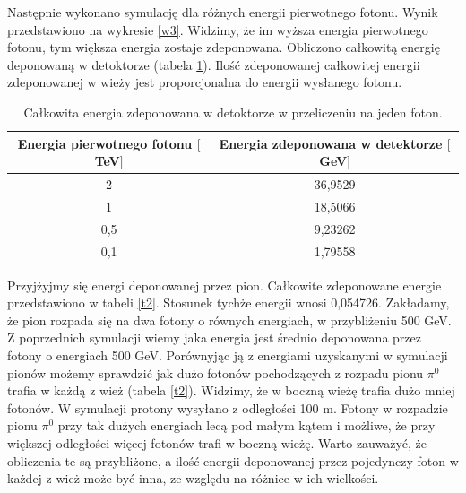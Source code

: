 \documentclass[11pt]{article}
\begin{document}
Następnie wykonano symulację dla różnych energii pierwotnego fotonu. Wynik przedstawiono na wykresie \ref{w3}. Widzimy, że im wyższa energia 
pierwotnego fotonu, tym większa energia zostaje zdeponowana. Obliczono całkowitą energię deponowaną w detoktorze (tabela \ref{t1}). 
Ilość zdeponowanej całkowitej energii zdeponowanej w wieży jest proporcjonalna do
energii wysłanego fotonu. 
\begin{table}
\caption{Całkowita energia zdeponowana w detoktorze w przeliczeniu na jeden foton.}\label{t1}
\centering
\begin{tabular}{c|c}
Energia pierwotnego fotonu $[$TeV$]$& Energia zdeponowana w detektorze $[$GeV$]$  \\ \hline
2 &36,9529 \\
1 &18,5066\\
0,5 &9,23262\\ 
0,1 & 1,79558 
\end{tabular}
\end{table}
\newpage
Przyjżyjmy się energi deponowanej przez pion. Całkowite zdeponowane energie przedstawiono w tabeli \ref{t2}. Stosunek tychże energii wnosi 0,054726. 
Zakładamy, że pion rozpada się na dwa fotony o równych energiach, w przybliżeniu 500 GeV. Z poprzednich symulacji wiemy jaka energia jest średnio deponowana
przez fotony o energiach 500 GeV. Porównyjąc ją z energiami uzyskanymi w symulacji pionów możemy sprawdzić jak dużo fotonów pochodzących z rozpadu pionu $\pi^0$
trafia w każdą z wież (tabela \ref{t2}). Widzimy, że w boczną wieżę trafia dużo mniej fotonów. W symulacji protony wysyłano z odległości 100 m. Fotony w 
rozpadzie pionu $\pi^0$ przy tak dużych energiach lecą pod małym kątem i możliwe, że przy większej odległości więcej fotonów trafi w boczną wieżę. Warto
zauważyć, że obliczenia te są przybliżone, a ilość energii deponowanej przez pojedynczy foton w każdej z wież może być inna, 
ze względu na różnice w ich wielkości. 
\end{document}
